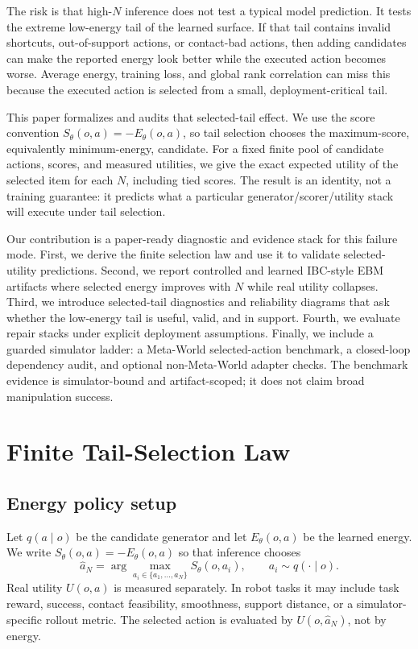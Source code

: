 \documentclass{article}
\newcommand{\energy}{E_\theta}
\newcommand{\score}{S_\theta}
\newcommand{\utility}{U}
\begin{document}
The risk is that high-\(N\) inference does not test a typical model prediction. It tests the extreme low-energy tail of the learned surface. If that tail contains invalid shortcuts, out-of-support actions, or contact-bad actions, then adding candidates can make the reported energy look better while the executed action becomes worse. Average energy, training loss, and global rank correlation can miss this because the executed action is selected from a small, deployment-critical tail.

This paper formalizes and audits that selected-tail effect. We use the score convention \(\score(o,a)=-\energy(o,a)\), so tail selection chooses the maximum-score, equivalently minimum-energy, candidate. For a fixed finite pool of candidate actions, scores, and measured utilities, we give the exact expected utility of the selected item for each \(N\), including tied scores. The result is an identity, not a training guarantee: it predicts what a particular generator/scorer/utility stack will execute under tail selection.

Our contribution is a paper-ready diagnostic and evidence stack for this failure mode. First, we derive the finite selection law and use it to validate selected-utility predictions. Second, we report controlled and learned IBC-style EBM artifacts where selected energy improves with \(N\) while real utility collapses. Third, we introduce selected-tail diagnostics and reliability diagrams that ask whether the low-energy tail is useful, valid, and in support. Fourth, we evaluate repair stacks under explicit deployment assumptions. Finally, we include a guarded simulator ladder: a Meta-World selected-action benchmark, a closed-loop dependency audit, and optional non-Meta-World adapter checks. The benchmark evidence is simulator-bound and artifact-scoped; it does not claim broad manipulation success.

\section{Finite Tail-Selection Law}

\subsection{Energy policy setup}

Let \(q(a\mid o)\) be the candidate generator and let \(\energy(o,a)\) be the learned energy. We write \(\score(o,a)=-\energy(o,a)\) so that inference chooses
\begin{equation}
    \hat a_N = \arg\max_{a_i \in \{a_1,\ldots,a_N\}} \score(o,a_i),
    \qquad a_i \sim q(\cdot \mid o).
\end{equation}
Real utility \(\utility(o,a)\) is measured separately. In robot tasks it may include task reward, success, contact feasibility, smoothness, support distance, or a simulator-specific rollout metric. The selected action is evaluated by \(\utility(o,\hat a_N)\), not by energy.
\end{document}
